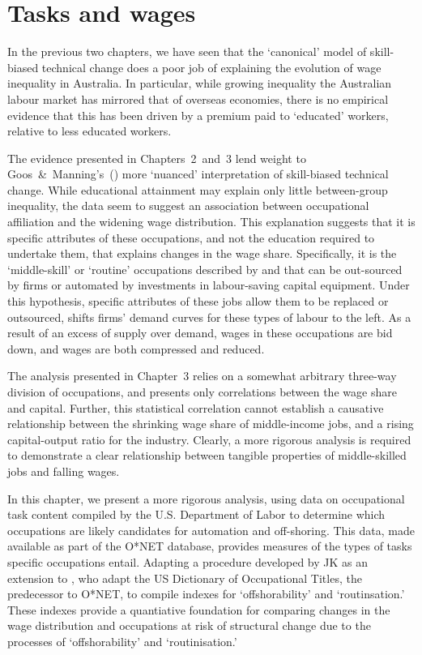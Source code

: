 \chapter{Tasks and wages}

In the previous two chapters, we have seen that the `canonical' model of skill-biased technical change does a poor job of explaining the evolution of wage inequality in Australia. In particular, while growing inequality the Australian labour market has mirrored that of overseas economies, there is no empirical evidence that this has been driven by a premium paid to `educated' workers, relative to less educated workers. 

The evidence presented in Chapters~2~and~3 lend weight to Goos~\&~Manning's~(\citeyear{Goos2007}) more `nuanced' interpretation of skill-biased technical change. While educational attainment may explain only little between-group inequality, the data seem to suggest an association between occupational affiliation and the widening wage distribution. This explanation suggests that it is specific attributes of these occupations, and not the education required to undertake them, that explains changes in the wage share. Specifically, it is the `middle-skill' or `routine' occupations described by \citet{Levy2003} and \citet{Goos2009} that can be out-sourced by firms or automated by investments in labour-saving capital equipment. Under this hypothesis, specific attributes of these jobs allow them to be replaced or outsourced, shifts firms' demand curves for these types of labour to the left. As a result of an excess of supply over demand, wages in these occupations are bid down, and wages are both compressed and reduced. 

The analysis presented in Chapter~3 relies on a somewhat arbitrary three-way division of occupations, and presents only correlations between the wage share and capital. Further, this statistical correlation cannot establish a causative relationship between the shrinking wage share of middle-income jobs, and a rising capital-output ratio for the industry. Clearly, a more rigorous analysis is required to demonstrate a clear relationship between tangible properties of middle-skilled jobs and falling wages.

In this chapter, we present a more rigorous analysis, using data on occupational task content compiled by the U.S. Department of Labor to determine which occupations are likely candidates for automation and off-shoring. This data, made available as part of the O*NET database, provides measures of the types of tasks specific occupations entail. Adapting a procedure developed by JK as an extension to \citet{Levy2003}, who adapt the US Dictionary of Occupational Titles, the predecessor to O*NET, to compile indexes for `offshorability' and `routinsation.' These indexes provide a quantiative foundation for comparing changes in the wage distribution and occupations at risk of structural change due to the processes of `offshorability' and `routinisation.'

